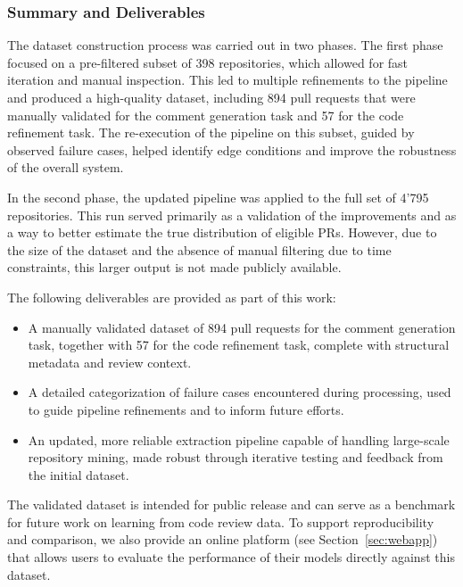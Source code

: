 \subsubsection{Summary and Deliverables}

The dataset construction process was carried out in two phases. The first phase focused on a
pre-filtered subset of 398 repositories, which allowed for fast iteration and manual inspection.
This led to multiple refinements to the pipeline and produced a high-quality dataset, including 894
pull requests that were manually validated for the comment generation task and 57 for the code
refinement task. The re-execution of the pipeline on this subset, guided by observed failure cases,
helped identify edge conditions and improve the robustness of the overall system.

In the second phase, the updated pipeline was applied to the full set of 4'795 repositories. This
run served primarily as a validation of the improvements and as a way to better estimate the true
distribution of eligible PRs. However, due to the size of the dataset and the absence of manual
filtering due to time constraints, this larger output is not made publicly available.

The following deliverables are provided as part of this work:
\begin{itemize}
	\item A manually validated dataset of 894 pull requests for the comment generation task,
        together with 57 for the code refinement task, complete with structural metadata and review context.
	\item A detailed categorization of failure cases encountered during processing, used to guide
	      pipeline refinements and to inform future efforts.
	\item An updated, more reliable extraction pipeline capable of handling large-scale repository
	      mining, made robust through iterative testing and feedback from the initial dataset.
\end{itemize}

The validated dataset is intended for public release and can serve as a benchmark for future work on
learning from code review data. To support reproducibility and comparison, we also provide an online
platform (see Section~\ref{sec:webapp}) that allows users to evaluate the performance of their
models directly against this dataset.
